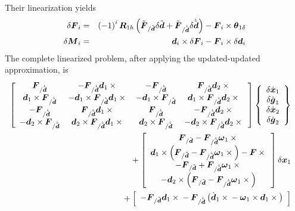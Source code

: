 \documentclass[10pt,dvips,fleqn,subeqn]{report}
\newcommand{\T}[1]{\boldsymbol{#1}}
\begin{document}
Their linearization yields
\begin{eqnarray*}
	\delta\T{F}_i & = & \plbr{ -1 }^i \T{R}_{1h} \plbr{
		\tilde{\T{F}}_{/\tilde{\T{d}}} \delta{\tilde{\T{d}}}
		+ \tilde{\T{F}}_{/\dot{\tilde{\T{d}}}} \delta\dot{\tilde{\T{d}}}
	} - \T{F}_i \times \T{\theta}_{1\delta} \\
	\delta\T{M}_i & = & \T{d}_i \times \delta\T{F}_i
	- \T{F}_i \times \delta \T{d}_i
\end{eqnarray*}
The complete linearized problem, after applying the updated-updated 
approximation, is
\begin{eqnarray*}
	\sqbr{\matr{cccc}{
		\T{F}_{/\dot{\tilde{\T{d}}}} & -\T{F}_{/\dot{\tilde{\T{d}}}} \T{d}_1\times{} &
			- \T{F}_{/\dot{\tilde{\T{d}}}} & \T{F}_{/\dot{\tilde{\T{d}}}} \T{d}_2\times{} \\
		\T{d}_1 \times \T{F}_{/\dot{\tilde{\T{d}}}} &
			- \T{d}_1 \times \T{F}_{/\dot{\tilde{\T{d}}}} \T{d}_1\times{} &
			- \T{d}_1 \times \T{F}_{/\dot{\tilde{\T{d}}}} &
			\T{d}_1 \times \T{F}_{/\dot{\tilde{\T{d}}}} \T{d}_2\times{} \\
		- \T{F}_{/\dot{\tilde{\T{d}}}} & \T{F}_{/\dot{\tilde{\T{d}}}} \T{d}_1\times{} &
			\T{F}_{/\dot{\tilde{\T{d}}}} & - \T{F}_{/\dot{\tilde{\T{d}}}} \T{d}_2\times{} \\
		- \T{d}_2 \times \T{F}_{/\dot{\tilde{\T{d}}}} &
			\T{d}_2 \times \T{F}_{/\dot{\tilde{\T{d}}}} \T{d}_1\times{} &
			\T{d}_2 \times \T{F}_{/\dot{\tilde{\T{d}}}} &
			- \T{d}_2 \times \T{F}_{/\dot{\tilde{\T{d}}}} \T{d}_2\times{}
	}} \cubr{\cvvect{
		\delta\dot{\T{x}}_1 \\
		\delta\dot{\T{g}}_1 \\
		\delta\dot{\T{x}}_2 \\
		\delta\dot{\T{g}}_2
	}} & & \\
	\mbox{} + \sqbr{\cvvect{
		\T{F}_{/\tilde{\T{d}}} - \T{F}_{/\dot{\tilde{\T{d}}}} \T{\omega}_1 \times{} \\
		\T{d}_1 \times \plbr{\T{F}_{/\tilde{\T{d}}} - \T{F}_{/\dot{\tilde{\T{d}}}} \T{\omega}_1 \times{}}
			- \T{F}\times{} \\
		- \T{F}_{/\tilde{\T{d}}} + \T{F}_{/\dot{\tilde{\T{d}}}} \T{\omega}_1 \times{} \\
		- \T{d}_2 \times \plbr{\T{F}_{/\tilde{\T{d}}} - \T{F}_{/\dot{\tilde{\T{d}}}} \T{\omega}_1 \times{}}
	}} \delta\T{x}_1 & & \\
	\mbox{} + \sqbr{\cvvect{
		- \T{F}_{/\tilde{\T{d}}} \T{d}_1 \times{}
		- \T{F}_{/\dot{\tilde{\T{d}}}} \plbr{
			\dot{\T{d}}_1 \times{} - \T{\omega}_1 \times \T{d}_1\times{}
}}}
\end{eqnarray*}
\end{document}
